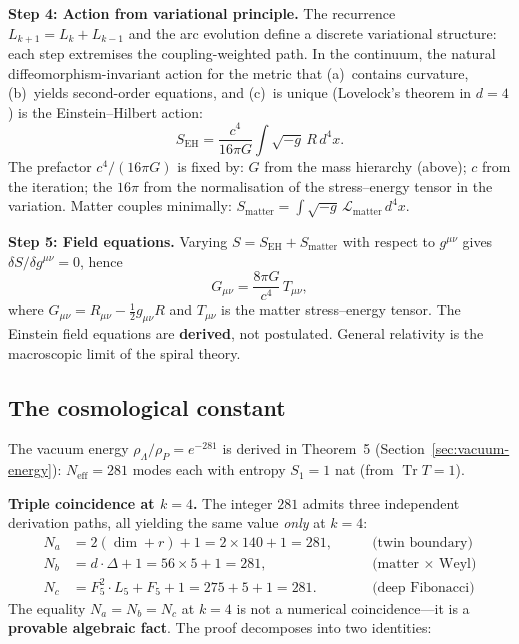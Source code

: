 \documentclass[12pt,a4paper]{article}
\begin{document}
\textbf{Step 4: Action from variational principle.} The recurrence $L_{k+1} = L_k + L_{k-1}$ and the arc evolution define a discrete variational structure: each step extremises the coupling-weighted path. In the continuum, the natural diffeomorphism-invariant action for the metric that (a)~contains curvature, (b)~yields second-order equations, and (c)~is unique (Lovelock's theorem in $d=4$) is the Einstein--Hilbert action:
\begin{equation}
S_{\mathrm{EH}} = \frac{c^4}{16\pi G}\int \sqrt{-g}\, R\, d^4x.
\end{equation}
The prefactor $c^4/(16\pi G)$ is fixed by: $G$ from the mass hierarchy (above); $c$ from the iteration; the $16\pi$ from the normalisation of the stress--energy tensor in the variation. Matter couples minimally: $S_{\mathrm{matter}} = \int \sqrt{-g}\, \mathcal{L}_{\mathrm{matter}}\, d^4x$.

\textbf{Step 5: Field equations.} Varying $S = S_{\mathrm{EH}} + S_{\mathrm{matter}}$ with respect to $g^{\mu\nu}$ gives $\delta S/\delta g^{\mu\nu} = 0$, hence
\begin{equation}
G_{\mu\nu} = \frac{8\pi G}{c^4}\, T_{\mu\nu},
\end{equation}
where $G_{\mu\nu} = R_{\mu\nu} - \tfrac{1}{2}g_{\mu\nu}R$ and $T_{\mu\nu}$ is the matter stress--energy tensor. The Einstein field equations are \textbf{derived}, not postulated. General relativity is the macroscopic limit of the spiral theory.

\subsection{The cosmological constant}

The vacuum energy $\rho_\Lambda/\rho_P = e^{-281}$ is derived in Theorem~5 (Section~\ref{sec:vacuum-energy}): $N_{\mathrm{eff}} = 281$ modes each with entropy $S_1 = 1$ nat (from $\operatorname{Tr}T = 1$).

\textbf{Triple coincidence at $k = 4$.} The integer $281$ admits three independent derivation paths, all yielding the same value \emph{only} at $k = 4$:
\begin{align}
N_a &= 2(\dim + r) + 1 = 2 \times 140 + 1 = 281, \qquad &\text{(twin boundary)} \label{eq:281a} \\
N_b &= d \cdot \Delta + 1 = 56 \times 5 + 1 = 281, \qquad &\text{(matter $\times$ Weyl)} \label{eq:281b} \\
N_c &= F_5^2 \cdot L_5 + F_5 + 1 = 275 + 5 + 1 = 281. \qquad &\text{(deep Fibonacci)} \label{eq:281c}
\end{align}
The equality $N_a = N_b = N_c$ at $k = 4$ is not a numerical coincidence---it is a \textbf{provable algebraic fact}.  The proof decomposes into two identities:
\end{document}
